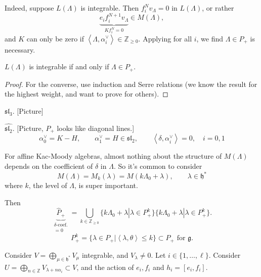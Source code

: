 Indeed, suppose $L(\Lambda)$ is integrable.
Then $f_i^Nv_\Lambda=0$ in $L(\Lambda)$,
or rather
$$
\underbrace{e_if_i^{N+1}v_\Lambda}
_{Kf_i^N=0} \in M(\Lambda),
$$
and $K$ can only be zero if
$\left\langle{}\Lambda,\alpha_i^\vee\right\rangle{}
\in \mathbb{Z}_{\geq 0}$. Applying for all
$i$, we find
$\Lambda \in P_+$ is necessary.

\begin{proposition}
\label{proposition-integ-iff-domin-integ}
$L(\Lambda)$ is integrable if and only if
$\Lambda \in P_+$.
\end{proposition}

\begin{proof}
For the converse, use induction and Serre
relations
(we know the result for the highest weight,
and want
to prove for others).
\end{proof}

\begin{example}
\label{example-sl3-integrability}
$\mathfrak{sl}_3$. [Picture]
\end{example}

\begin{example}
\label{example-sl_2hat-integrability}
$\widehat{\mathfrak{sl}_2}$. [Picture, $P_+$
looks like diagonal lines.]
$$
\alpha_0^\vee=K-H,\qquad
\alpha_1^\vee=H\in\mathfrak{sl}_2,
\qquad
\left\langle{}\delta,\alpha_i^\vee\right\rangle{}=0,\quad
i=0,1
$$
\end{example}

\begin{remark}
\label{remark-verma-affin-kac-moody-algeb}
For affine Kac-Moody algebras, almost nothing
about the structure of
$M(\Lambda)$ depends on the coefficient of
$\delta$ in $\Lambda$.
So it's common to consider
$$
M(\Lambda)=M_k(\lambda)=M(k\Lambda_0+\lambda)
,\qquad
\lambda \in \mathfrak{h}^*
$$
where $k$, the level of $\Lambda$, is super
important.
\end{remark}

Then
$$
\underbrace{\hat{P}_+}_{
\substack{\delta\text{-coef.} \\ =0}}
=\bigcup_{k \in \mathbb{Z}_{\geq 0}}
\{k\Lambda_0+\lambda|\lambda \in P_+^k\}
\{k\Lambda_0+\lambda|\lambda \in P_+^k\}.
$$
$$
P_+^k=\{\lambda \in P_+|
\left\langle{}\lambda,\theta\right\rangle{}\leq k\}\subset
P_+ \text{ for }\mathfrak{g}.
$$

\medskip\noindent
Consider $V= \bigoplus_{\mu \in
\mathfrak{h}^*}V_\mu$ integrable,
and $V_\lambda \neq 0$.
Let $i \in \{1,\ldots,\ell\}$.
Consider $U=\bigoplus_{n \in
\mathbb{Z}}V_{\lambda+n\alpha_i}\subset V$,
and the action of $e_i,f_i$ and
$h_i=[e_i,f_i]$.

